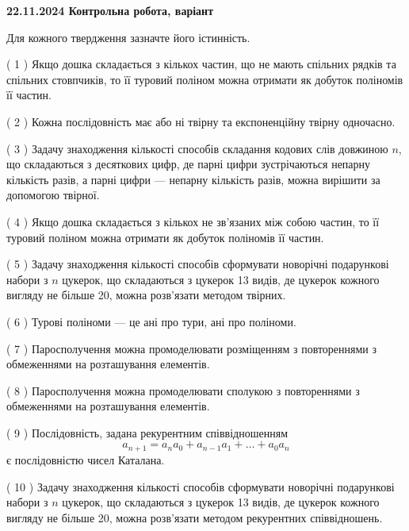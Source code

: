 \documentclass[12pt, ukrainian]{article}
\begin{document}
\vspace{4mm}
\newpage
\begin {large}

\textbf{22.11.2024 Контрольна робота, варіант  }\par


{
Для кожного твердження зазначте його істинність.\par
\vspace{2mm}
( 1 ) Якщо дошка складається з кількох частин, що не мають спільних рядків та спільних стовпчиків, то її туровий поліном можна отримати як добуток поліномів її частин.%

( 2 ) Кожна послідовність має або ні твірну та експоненційну твірну одночасно.%

( 3 ) Задачу знаходження кількості способів складання кодових слів довжиною $n$, що складаються з десяткових цифр, де парні цифри зустрічаються непарну кількість разів, а парні цифри — непарну кількість разів, можна вирішити за допомогою твірної.%

( 4 ) Якщо дошка складається з кількох не зв’язаних між собою частин, то її туровий поліном можна отримати як добуток поліномів її частин.%

( 5 ) Задачу знаходження кількості способів сформувати новорічні подарункові набори з $n$ цукерок, що складаються з цукерок 13 видів, де цукерок кожного вигляду не більше 20, можна розв’язати методом твірних.%

( 6 ) Турові поліноми --- це ані про тури, ані про поліноми.%

( 7 ) Паросполучення можна промоделювати розміщенням з повтореннями з обмеженнями на розташування елементів.%

( 8 ) Паросполучення можна промоделювати сполукою з повтореннями з обмеженнями на розташування елементів.%

( 9 ) Послідовність, задана рекурентним співвідношенням $$a_{n+1}=a_{n}a_{0}+a_{n-1}a_{1}+\ldots+a_0a_{n}$$ є послідовністю чисел Каталана.%

( 10 ) Задачу знаходження кількості способів сформувати новорічні подарункові набори з $n$ цукерок, що складаються з цукерок 13 видів, де цукерок кожного вигляду не більше 20, можна розв’язати методом рекурентних співвідношень.%


\vspace{5mm}
}
\end {large}
\end{document}
